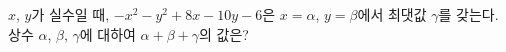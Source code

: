 $x$, $y$가 실수일 때, $-x^2-y^2+8x-10y-6$은 $x=\alpha$, $y=\beta$에서 최댓값 $\gamma$를 갖는다. 상수 $\alpha$, $\beta$, $\gamma$에 대하여 $\alpha+\beta+\gamma$의 값은?
